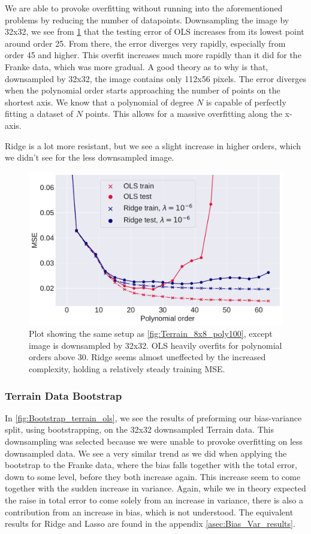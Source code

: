 \documentclass[10pt, twocolumn]{article}
\begin{document}
We are able to provoke overfitting without running into the aforementioned problems by reducing the number of datapoints. Downsampling the image by 32x32, we see from \cref{fig:overfit32} that the testing error of OLS increases from its lowest point around order 25. From there, the error diverges very rapidly, especially from order 45 and higher. This overfit increases much more rapidly than it did for the Franke data, which was more gradual. A good theory as to why is that, downsampled by 32x32, the image contains only 112x56 pixels. The error diverges when the polynomial order starts approaching the number of points on the shortest axis. We know that a polynomial of degree $N$ is capable of perfectly fitting a dataset of $N$ points. This allows for a massive overfitting along the x-axis.

Ridge is a lot more resistant, but we see a slight increase in higher orders, which we didn't see for the less downsampled image.

\begin{figure}[h!]
    \centering
    \includegraphics[scale=0.4]{../figs/OLS_Ridge_Terrain_32sample.pdf}
    \caption{Plot showing the same setup as \cref{fig:Terrain_8x8_poly100}, except image is downsampled by 32x32. OLS heavily overfits for polynomial orders above 30. Ridge seems almost uneffected by the increased complexity, holding a relatively steady training MSE.}
    \label{fig:overfit32}
\end{figure}


\subsubsection{Terrain Data Bootstrap}
In \cref{fig:Bootstrap_terrain_ols}, we see the results of preforming our bias-variance split, using bootstrapping, on the 32x32 downsampled Terrain data. This downsampling was selected because we were unable to provoke overfitting on less downsampled data. We see a very similar trend as we did when applying the bootstrap to the Franke data, where the bias falls together with the total error, down to some level, before they both increase again. This increase seem to come together with the sudden increase in variance. Again, while we in theory expected the raise in total error to come solely from an increase in variance, there is also a contribution from an increase in bias, which is not understood. The equivalent results for Ridge and Lasso are found in the appendix \ref{asec:Bias_Var_results}. 
\end{document}

